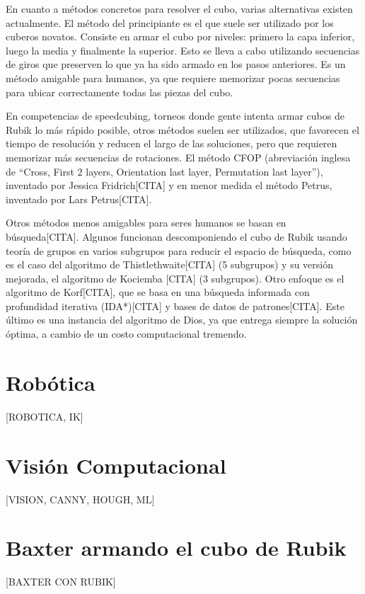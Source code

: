 En cuanto a métodos concretos para resolver el cubo, varias alternativas existen actualmente. El método del principiante es el que suele ser utilizado por los cuberos novatos. Consiste en armar el cubo por niveles: primero la capa inferior, luego la media y finalmente la superior. Esto se lleva a cabo utilizando secuencias de giros que preserven lo que ya ha sido armado en los pasos anteriores. Es un método amigable para humanos, ya que requiere memorizar pocas secuencias para ubicar correctamente todas las piezas del cubo.

En competencias de speedcubing, torneos donde gente intenta armar cubos de Rubik lo más rápido posible, otros métodos suelen ser utilizados, que favorecen el tiempo de resolución y reducen el largo de las soluciones, pero que requieren memorizar más secuencias de rotaciones. El método CFOP (abreviación inglesa de ``Cross, First 2 layers, Orientation last layer, Permutation last layer''), inventado por Jessica Fridrich[CITA] y en menor medida el método Petrus, inventado por Lars Petrus[CITA].

Otros métodos menos amigables para seres humanos se basan en búsqueda[CITA]. Algunos funcionan descomponiendo el cubo de Rubik usando teoría de grupos en varios subgrupos para reducir el espacio de búsqueda, como es el caso del algoritmo de Thistlethwaite[CITA] (5 subgrupos) y su versión mejorada, el algoritmo de Kociemba [CITA] (3 subgrupos). Otro enfoque es el algoritmo de Korf[CITA], que se basa en una búsqueda informada con profundidad iterativa (IDA*)[CITA] y bases de datos de patrones[CITA]. Este último es una instancia del algoritmo de Dios, ya que entrega siempre la solución óptima, a cambio de un costo computacional tremendo.

\section*{Robótica}
[ROBOTICA, IK]

\section*{Visión Computacional}
[VISION, CANNY, HOUGH, ML]

\section*{Baxter armando el cubo de Rubik}
[BAXTER CON RUBIK]
